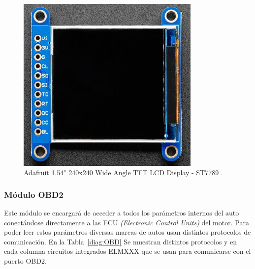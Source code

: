 \begin{figure}[hbt!]
\centering
\includegraphics[width=0.8\textwidth]{IPS_LCD.jpg}
\caption[Adafruit 1.54" 240x240 Wide Angle TFT LCD Display - ST7789]{Adafruit 1.54" 240x240 Wide Angle TFT LCD Display - ST7789 \cite{IPS_LCD}.}
\label{fig:Display}
\end{figure}











\subsubsection{Módulo OBD2}
Este módulo se encargará de acceder a todos los parámetros internos del auto conectándose directamente a las ECU \textit{(Electronic Control Units)} del motor. Para poder leer estos parámetros diversas marcas de autos usan distintos protocolos de comunicación. En la Tabla~\ref{diag:OBD} Se muestran distintos protocolos y en cada columna circuitos integrados ELMXXX que se usan para comunicarse con el puerto OBD2.

